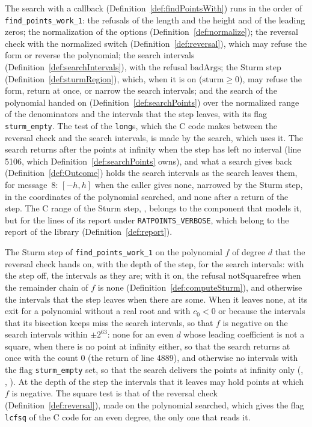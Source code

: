 The search with a callback (Definition~\ref{def:findPointsWith}) runs in the order of
\verb|find_points_work_1|: the refusals of the length and the height and of the leading zeros; the
normalization of the options (Definition~\ref{def:normalize}); the reversal check with the
normalized switch (Definition~\ref{def:reversal}), which may refuse the form or reverse the
polynomial; the search intervals (Definition~\ref{def:searchIntervals}), with the refusal
$\mathrm{badArgs}$; the Sturm step (Definition~\ref{def:sturmRegion}), which, when it is on
($\mathrm{sturm} \ge 0$), may refuse the form, return at once, or narrow the search intervals; and
the search of the polynomial handed on (Definition~\ref{def:searchPoints}) over the normalized range
of the denominators and the intervals that the step leaves, with its flag \verb|sturm_empty|. The
test of the \verb|long|s, which the C code makes between the reversal check and the search
intervals, is made by the search, which uses it. The search returns after the points at infinity
when the step has left no interval (line 5106, which Definition~\ref{def:searchPoints} owns), and
what a search gives back (Definition~\ref{def:Outcome}) holds the search intervals as the search
leaves them, for message~8: $[-h, h]$ when the caller gives none, narrowed by the Sturm step, in the
coordinates of the polynomial searched, and none after a return of the step. The C range of the
Sturm step, , belongs to the component that models it, but for
the lines of its report under \verb|RATPOINTS_VERBOSE|, which belong to the report of the library
(Definition~\ref{def:report}).

\begin{definition}\label{def:sturmRegion}
  \leanok
  The Sturm step of \verb|find_points_work_1| on the polynomial $f$ of degree $d$ that the reversal
  check hands on, with the depth of the step, for the search intervals: with the step off, the
  intervals as they are; with it on, the refusal $\mathrm{notSquarefree}$ when the remainder chain
  of $f$ is none (Definition~\ref{def:computeSturm}), and otherwise the intervals that the step
  leaves when there are some. When it leaves none, at its exit for a polynomial without a real root
  and with $c_0 < 0$ or because the intervals that its bisection keeps miss the search intervals, so
  that $f$ is negative on the search intervals within $\pm 2^{63}$: none for an even $d$ whose
  leading coefficient is not a square, when there is no point at infinity either, so that the search
  returns at once with the count $0$ (the return of line 4889), and otherwise no intervals with the
  flag \verb|sturm_empty| set, so that the search delivers the points at infinity only
  (, ,
  ). At the depth of the step the intervals that it leaves may
  hold points at which $f$ is negative. The square test is that of the reversal check
  (Definition~\ref{def:reversal}), made on the polynomial searched, which gives the flag
  \verb|lcfsq| of the C code for an even degree, the only one that reads it.
\end{definition}

